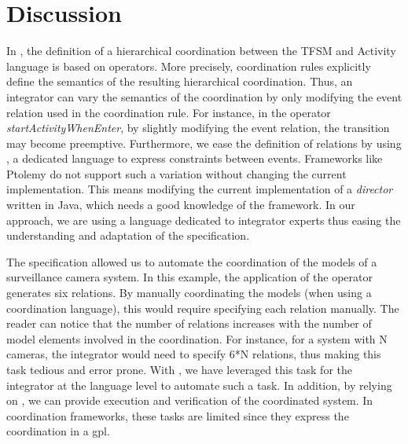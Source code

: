 \section{Discussion}
In \bcool, the definition of a hierarchical coordination between the TFSM and Activity language is based on operators. More precisely, coordination rules explicitly define the semantics of the resulting hierarchical coordination. Thus, an integrator can vary the semantics of the coordination by only modifying the event relation used in the coordination rule. For instance, in the operator \emph{startActivityWhenEnter}, by slightly modifying the event relation, the transition may become preemptive. Furthermore, we ease the definition of relations by using \moccml, a dedicated language to express constraints between events. Frameworks like Ptolemy do not support such a variation without changing the current implementation. This means modifying the current implementation of a \emph{director} written in Java, which needs a good knowledge of the framework. In our approach, we are using a language dedicated to integrator experts thus easing the understanding and adaptation of the \bcool specification.
		
The \bcool specification allowed us to automate the coordination of the models of a surveillance camera system. In this example, the application of the operator generates six \ccsl relations. By manually coordinating the models (when using a coordination language), this would require specifying each relation manually. The reader can notice that the number of relations increases with the number of model elements involved in the coordination. For instance, for a system with N cameras, the integrator would need to specify 6*N relations, thus making this task tedious and error prone. With \bcool, we have leveraged this task for the integrator at the language level to automate such a task. In addition, by relying on \ccsl, we can provide execution and verification of the coordinated system. In coordination frameworks, these tasks are limited since they express the coordination in a gpl. 